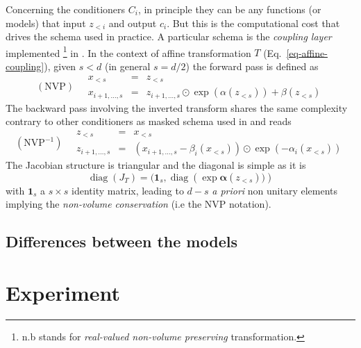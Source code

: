 \documentclass[11pt]{amsart}
\DeclareMathOperator{\diag}{diag}
\begin{document}
Concerning the conditioners $C_i$, in principle they can be any functions (or models) that input $z_{<i}$ and output $c_i$. But this is the computational cost that drives the schema used in practice. A particular schema is the \textit{coupling layer} implemented \footnote{n.b stands for \textit{real-valued non-volume preserving} transformation.} in \citep{DinhKB14,DinhSB17}. In the context of affine transformation $T$ (Eq.~\ref{eq-affine-coupling}), given $s<d$ (in general $s=d/2$) the forward pass is defined as 
\begin{equation}
(\mathrm{NVP})\quad  \begin{array}{rcl}
x_{<s} &=& z_{<s} \\
x_{i+1,\dots,s} &=& z_{i+1,\dots,s} \odot \exp(\alpha(z_{<s})) + \beta(z_{<s}) 
\end{array}
\label{eq-NVP_forward}
\end{equation}
 The backward pass involving the inverted transform shares the same complexity contrary to other conditioners as masked schema used in \citep{Germain2015} and reads
\begin{equation}
(\mathrm{NVP}^{-1})\quad  \begin{array}{rcl}
z_{<s} &=& x_{<s} \\
z_{i+1,\dots,s} &=& (x_{i+1,\dots,s}- \beta_i(x_{<s}))  \odot \exp(-\alpha_i(x_{<s})) 
\end{array}
\label{eq-NVP_backward}
\end{equation}
The Jacobian structure is triangular and the diagonal is simple as it is
\begin{equation}
\diag(J_T) = (\bm{1}_s,\diag(\exp{\bm{\alpha}(z_{<s}))})
\end{equation}
with $\bm{1}_s$ a $s\times s$ identity matrix, leading to $d-s$ \textit{a priori} non unitary elements implying the \textit{non-volume conservation} (i.e the NVP notation).

%
\subsection{Differences between the models}
%
%
\section{Experiment}

\end{document}
